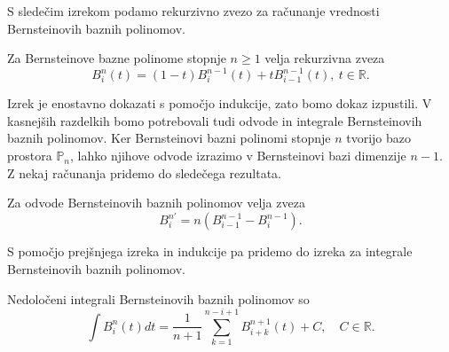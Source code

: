\documentclass[isrm2, tisk]{fmfdelo}
\newcommand{\R}{\mathbb R}
\begin{document}
    S sledečim izrekom podamo rekurzivno zvezo za računanje vrednosti Bernsteinovih baznih polinomov.
    \begin{izrek}
        \label{izrek:bernsteinovi_lastnosti:rekruzija}
        Za Bernsteinove bazne polinome stopnje $n\geq1$ velja rekurzivna zveza
        \[B_i^n(t) = (1-t)B_i^{n-1}(t) + tB_{i-1}^{n-1}(t),\ t\in\R.\]
    \end{izrek}
    \noindent Izrek je enostavno dokazati s pomočjo indukcije, zato bomo dokaz izpustili.
    V kasnejših razdelkih bomo potrebovali tudi odvode in integrale Bernsteinovih baznih polinomov.
    Ker Bernsteinovi bazni polinomi stopnje $n$ tvorijo bazo prostora $\mathbb{P}_n$, lahko njihove odvode izrazimo v Bernsteinovi bazi dimenzije $n-1$.
    Z nekaj računanja pridemo do sledečega rezultata.
    \begin{izrek}
        \label{izrek:bernstein-odvod}
        Za odvode Bernsteinovih baznih polinomov velja zveza
        \[B_{i}^{n\prime}=n(B_{i-1}^{n-1} - B_{i}^{n-1}).\]
    \end{izrek}
    \noindent S pomočjo prejšnjega izreka in indukcije pa pridemo do izreka za integrale Bernsteinovih baznih polinomov.
    \begin{izrek}
        \label{izrek:bernstein-integral}
        Nedoločeni integrali Bernsteinovih baznih polinomov so
        \[\int B_{i}^{n}(t)dt= \frac{1}{n+1} \sum_{k=1}^{n-i+1}  B_{i+k}^{n+1}(t) + C,\quad C\in\R. \]
    \end{izrek}
\end{document}
